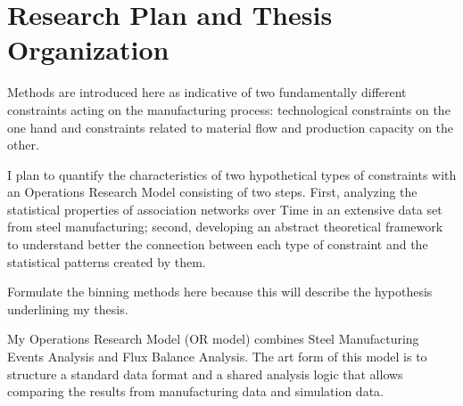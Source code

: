 \section{Research Plan and Thesis Organization}

{\color{red} 
	Methods are introduced here as indicative of two fundamentally different constraints acting on the manufacturing process: technological constraints on the one hand and constraints related to material flow and production capacity on the other.
	
	I plan to quantify the characteristics of two hypothetical types of constraints with an Operations Research Model consisting of two steps. First, analyzing the statistical properties of association networks over Time in an extensive data set from steel manufacturing; second, developing an abstract theoretical framework to understand better the connection between each type of constraint and the statistical patterns created by them. 
	
	Formulate the binning methods here because this will describe the hypothesis underlining my thesis.
	
	My Operations Research Model (OR model) combines Steel Manufacturing Events Analysis and Flux Balance Analysis. The art form of this model is to structure a standard data format and a shared analysis logic that allows comparing the results from manufacturing data and simulation data.
}